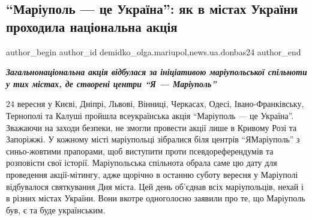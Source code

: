  
 
 
 
 
 
\subsection{\enquote{Маріуполь — це Україна}: як в містах України проходила національна акція}
\label{sec:24_09_2022.stz.news.ua.donbas24.1.mrpl_ce_ukr_akcia}
 
\ifcmt
 author_begin
   author_id demidko_olga.mariupol,news.ua.donbas24
 author_end
\fi


\begin{center}
  \em\color{blue}\bfseries\Large
Загальнонаціональна акція відбулася за ініціативою маріупольської спільноти у
тих містах, де створені центри \enquote{Я — Маріуполь} 
\end{center}

24 вересня у Києві, Дніпрі, Львові, Вінниці, Черкасах, Одесі,
Івано-Франківську, Тернополі та Калуші пройшла всеукраїнська акція \enquote{Маріуполь —
це Україна}. Зважаючи на заходи безпеки, не змогли провести акції лише в
Кривому Розі та Запоріжжі. У кожному місті маріупольці зібралися біля центрів
\enquote{ЯМаріуполь} з синьо-жовтими прапорами, щоб виступити проти псевдореферендумів
та розповісти свої історії. Маріупольська спільнота обрала саме цю дату для
проведення акції-мітингу, адже щорічно в останню суботу вересня у Маріуполі
відбувалося святкування Дня міста. Цей день об'єднав всіх маріупольців, нехай і
в різних містах України. Вони вкотре одноголосно заявили про те, що Маріуполь
був, є та буде українським.


